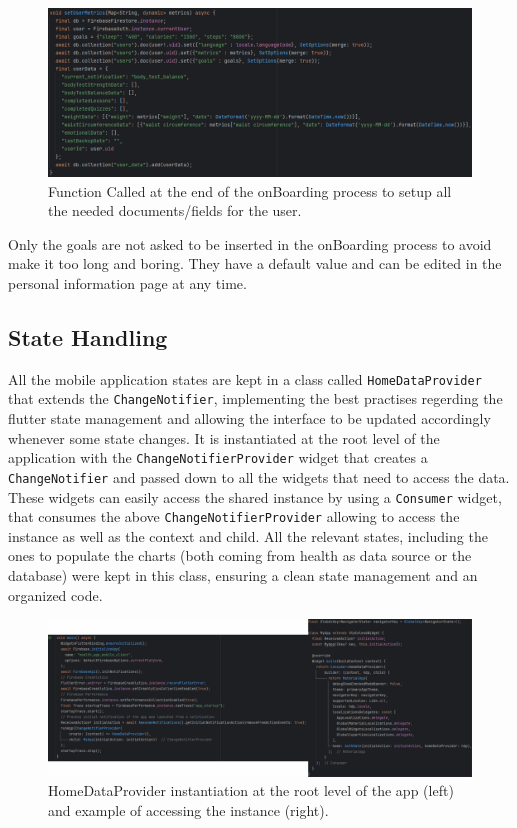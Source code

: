 \begin{figure}
    \includegraphics[width=1.0\linewidth]{./images/onBoarding.png}
    \caption{Function Called at the end of the onBoarding process to setup all the needed documents/fields for the user.}
\end{figure}

\noindent Only the goals are not asked to be inserted in the onBoarding process to avoid make it too long and boring. They have a default value and can be edited in the personal information page at any time.
\newpage

\subsection{State Handling}
All the mobile application states are kept in a class called \texttt{HomeDataProvider} that extends the \texttt{ChangeNotifier}, implementing the best practises regerding the flutter state management and allowing the interface to be updated accordingly whenever some state changes. It is instantiated at the root level of the application with the \texttt{ChangeNotifierProvider} widget that creates a \texttt{ChangeNotifier} and passed down to all the widgets that need to access the data. These widgets can easily access the shared instance by using a \texttt{Consumer} widget, that consumes the above \texttt{ChangeNotifierProvider} allowing to access the instance as well as the context and child. All the relevant states, including the ones to populate the charts (both coming from health as data source or the database) were kept in this class, ensuring a clean state management and an organized code.
\vspace{10ex}
\begin{figure}
    \includegraphics[width=1.0\linewidth]{./images/provider.jpg}
    \caption{HomeDataProvider instantiation at the root level of the app (left) and example of accessing the instance (right).}
    \label{fig:rootHdp}
\end{figure}
\newpage

